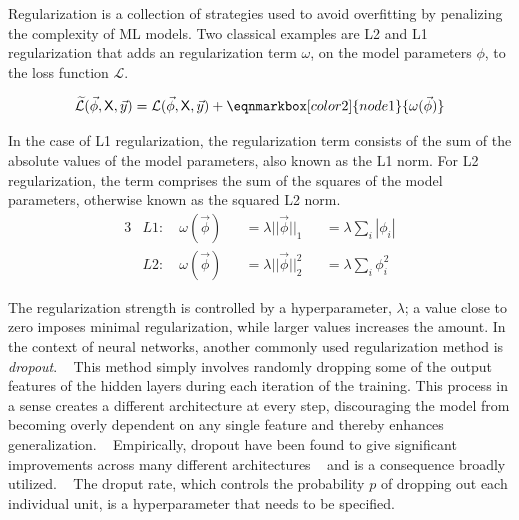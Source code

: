 Regularization is a collection of strategies used to avoid
overfitting by penalizing the complexity of \ac{ML} models.
Two classical examples are L2 and L1 regularization
that adds an regularization term \(\omega\),
on the model parameters \(\phi\),
to the loss function \(\mathcal{L}\).
~\autocite{goodfellow2016deep}

\vspace{1.5em}
\begin{equation}
    \widetilde{\mathcal{L}} (\vec{\phi} , \mathsf{X}, \vec{y}) =
    \mathcal{L} (\vec{\phi} , \mathsf{X}, \vec{y}) +
    \eqnmarkbox[color2]{node1}{ \omega (\vec{\phi})}
\end{equation}

In the case of L1 regularization, 
the regularization term consists of 
the sum of the absolute values of the model parameters, 
also known as the L1 norm. 
For L2 regularization, 
the term comprises the sum of the squares of the model parameters, 
otherwise known as the squared L2 norm.
~\autocite{murphyMachine2012}
%
\begin{alignat}{3}
    &L1: \quad \omega (\vec{\phi}) 
        &&= \lambda||\vec{\phi}||_1 
        &&= \lambda\sum_{i}|\phi_i|  \\
    &L2: \quad \omega (\vec{\phi}) 
        &&= \lambda||\vec{\phi}||_2^2 
        &&= \lambda\sum_{i} \phi_i^2
\end{alignat}

The regularization strength is controlled by a hyperparameter, \(\lambda\);
a value close to zero imposes minimal regularization, 
while larger values increases the amount.
In the context of neural networks, 
another commonly used regularization method is \textit{dropout}.
~\autocite{srivastava2014dropout}
This method simply involves randomly dropping some of the output features
of the hidden layers during each iteration of the training.
This process in a sense creates a different architecture at every step,
discouraging the model from becoming overly dependent on any single feature 
and thereby enhances generalization. 
~\autocite{charniakIntroduction2019}
Empirically, dropout have been found to give significant improvements across
many different architectures 
~\autocite{srivastava2014dropout}
and is a consequence broadly utilized.
~\autocite{charniakIntroduction2019}
The droput rate, which controls the probability \(p\) of dropping out each
individual unit, is a hyperparameter that needs to be specified.

